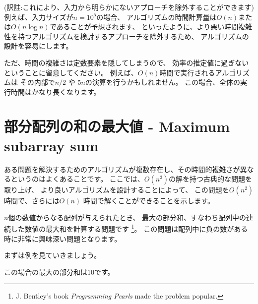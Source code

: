 (訳註:これにより、入力から明らかにないアプローチを除外することができます)
例えば、入力サイズが$n=10^5$の場合、
アルゴリズムの時間計算量は$O(n)$また は$O(n \log n)$であることが予想されます、
といったように、より悪い時間複雑性を持つアルゴリズムを検討するアプローチを除外するため、
アルゴリズムの設計を容易にします。


ただ、時間の複雑さは定数要素を隠してしまうので、
効率の推定値に過ぎないということに留意してください。
例えば、$O(n)$時間で実行されるアルゴリズムは
その内部で$n/2$ や $5n$の演算を行うかもしれません。
この場合、全体の実行時間はかなり長くなります。

\section{部分配列の和の最大値 - Maximum subarray sum}


ある問題を解決するためのアルゴリズムが複数存在し、その時間的複雑さが異なるというのはよくあることです。
ここでは、$O(n^3)$の解を持つ古典的な問題を取り上げ、
より良いアルゴリズムを設計することによって、
この問題を$O(n^2)$ 時間で、さらには$O(n)$ 時間で解くことができることを示します。

$n$個の数値からなる配列が与えられたとき、
最大の部分和、すなわち配列中の連続した数値の最大和を計算する問題です
\footnote{J. Bentley's
book \emph{Programming Pearls} \cite{ben86} made the problem popular.}。
この問題は配列中に負の数がある時に非常に興味深い問題となります。

まずは例を見ていきましょう。
\begin{center}
\end{center}
\begin{samepage}
この場合の最大の部分和は$10$です。
\begin{center}
\end{center}
\end{samepage}

